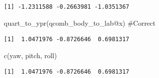 \documentclass[
  letterpaper,
  DIV=11,
  numbers=noendperiod]{scrartcl}
\newenvironment{Shaded}{\begin{snugshade}}{\end{snugshade}}
\newcommand{\CommentTok}[1]{\textcolor[rgb]{0.37,0.37,0.37}{#1}}
\newcommand{\FunctionTok}[1]{\textcolor[rgb]{0.28,0.35,0.67}{#1}}
\newcommand{\NormalTok}[1]{\textcolor[rgb]{0.00,0.23,0.31}{#1}}
\newcommand{\SpecialCharTok}[1]{\textcolor[rgb]{0.37,0.37,0.37}{#1}}
\begin{document}
\begin{verbatim}
[1] -1.2311588 -0.2663981 -1.0351367
\end{verbatim}

\begin{Shaded}
\begin{Highlighting}[]
\FunctionTok{quart\_to\_ypr}\NormalTok{(qcomb\_body\_to\_lab}\SpecialCharTok{@}\NormalTok{x) }\CommentTok{\#Correct}
\end{Highlighting}
\end{Shaded}

\begin{verbatim}
[1]  1.0471976 -0.8726646  0.6981317
\end{verbatim}

\begin{Shaded}
\begin{Highlighting}[]
\FunctionTok{c}\NormalTok{(yaw, pitch, roll)}
\end{Highlighting}
\end{Shaded}

\begin{verbatim}
[1]  1.0471976 -0.8726646  0.6981317
\end{verbatim}
\end{document}
